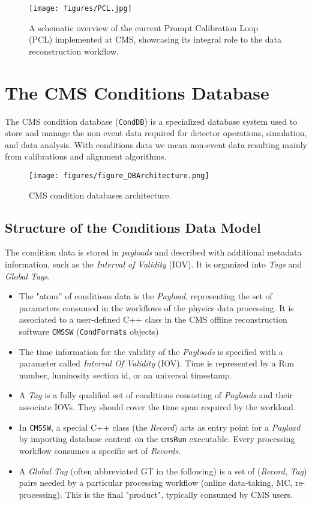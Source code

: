 \begin{figure}[h!]	
\centering
\texttt{[image: figures/PCL.jpg]} %
\caption{A schematic overview of the current Prompt Calibration Loop (PCL) implemented at CMS, showcasing its integral role to the data reconstruction workflow.} %
\label{fig:PCL}
\end{figure}

\section{The CMS Conditions Database}

The CMS condition database (\texttt{CondDB}) is a specialized database system used to store and manage the non event data required for detector operations, simulation, and data analysis. With conditions data we mean non-event data resulting mainly from calibrations and alignment algorithms.

\begin{figure}[h!]	
\centering
\texttt{[image: figures/figure\_DBArchitecture.png]} %
\caption{CMS condition databases architecture. \cite{Gruttola_2010}} 
\label{fig:CondDB}
\end{figure}

\subsection{Structure of the Conditions Data Model}
The condition data is stored in \emph{payloads} and described with additional metadata information, such as the \emph{Interval of
Validity} (IOV). It is organized into \emph{Tags} and \emph{Global Tags}.
\begin{itemize}
\item The "atom” of conditions data is the \emph{Payload}, representing the set of parameters consumed in the workflows of the physics data processing. It is associated to a user-defined C++ class in the CMS offline reconstruction software \texttt{CMSSW} (\texttt{CondFormats} objects)
\item The time information for the validity of the \emph{Payloads} is specified with a parameter called \emph{Interval Of Validity} (IOV). Time is represented by a Run number, luminosity section id, or an universal timestamp.
\item A \emph{Tag} is a fully qualified set of conditions consisting of
\emph{Payloads} and their associate IOVs. They should cover the time span required by the workload. 
\item In \texttt{CMSSW}, a special C++ class (the \emph{Record}) acts as entry point for a \emph{Payload} by importing database content on the \texttt{cmsRun} executable. Every processing workflow consumes a specific set of \emph{Records}.
\item A \emph{Global Tag} (often abbreviated GT in the following) is a set of (\emph{Record}, \emph{Tag}) pairs needed by a particular processing workflow (online data-taking, MC, re-processing). This is the final "product", typically consumed by CMS users.
\end{itemize}


